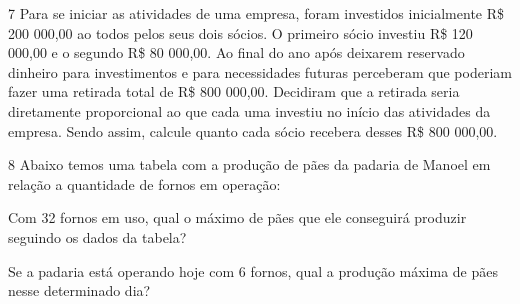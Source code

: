 
\num{7} Para se iniciar as atividades de uma empresa, foram investidos
inicialmente R\$ 200 000,00 ao todos pelos seus dois sócios. O primeiro
sócio investiu R\$ 120 000,00 e o segundo R\$ 80 000,00. Ao final do ano
após deixarem reservado dinheiro para investimentos e para necessidades
futuras perceberam que poderiam fazer uma retirada total de R\$ 800
000,00. Decidiram que a retirada seria diretamente proporcional ao que
cada uma investiu no início das atividades da empresa. Sendo assim,
calcule quanto cada sócio recebera desses R\$ 800 000,00.



\num{8} Abaixo temos uma tabela com a produção de pães da padaria de Manoel
em relação a quantidade de fornos em operação:


\begin{escolha}
\item
  Com 32 fornos em uso, qual o máximo de pães que ele conseguirá
  produzir seguindo os dados da tabela?


\item
  Se a padaria está operando hoje com 6 fornos, qual a produção máxima
  de pães nesse determinado dia?

\end{escolha}

